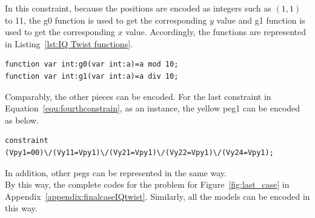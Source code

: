\bigskip
\smallbreak
In this constraint, because the positions are encoded as integers such as $(1,1)$ to 11, the g0 function is used to get the corresponding $y$ value and g1 function is used to get the corresponding $x$ value. Accordingly, the functions are represented in Listing~\ref{lst:IQ Twist functions}.
\begin{lstlisting}[language=minizinc,numbers=none,caption={Encoding for functions},label={lst:IQ Twist functions}]
function var int:g0(var int:a)=a mod 10;
function var int:g1(var int:a)=a div 10;
\end{lstlisting}
\bigskip
\smallbreak
Comparably, the other pieces can be encoded. For the last constraint in Equation~\ref{equ:fourthconstrain}, as an instance, the yellow peg1 can be encoded as below.
\begin{lstlisting}[language=minizinc,numbers=none,caption={Encoding for constraint four},label={lst:IQ Twist constraint4}]
constraint (Vpy1=00)\/(Vy11=Vpy1)\/(Vy21=Vpy1)\/(Vy22=Vpy1)\/(Vy24=Vpy1);
\end{lstlisting}
\bigskip
\smallbreak
In addition, other pegs can be represented in the same way.
\\By this way, the complete codes for the problem for Figure~\ref{fig:last_case} in Appendix~\ref{appendix:finalcaseIQtwist}. Similarly, all the models can be encoded in this way.
